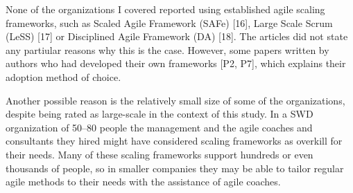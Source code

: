 None of the organizations I covered reported using established agile
scaling frameworks, such as Scaled Agile Framework (SAFe) [16], Large
Scale Scrum (LeSS) [17] or Disciplined Agile Framework (DA) [18]. The
articles did not state any partiular reasons why this is the case.
However, some papers written by authors who had developed their own
frameworks [P2, P7], which explains their adoption method of choice.

Another possible reason is the relatively small size of some of the
organizations, despite being rated as large-scale in the context of this
study. In a SWD organization of 50–80 people the management and the
agile coaches and consultants they hired might have considered scaling
frameworks as overkill for their needs. Many of these scaling frameworks
support hundreds or even thousands of people, so in smaller companies
they may be able to tailor regular agile methods to their needs with the
assistance of agile coaches.
